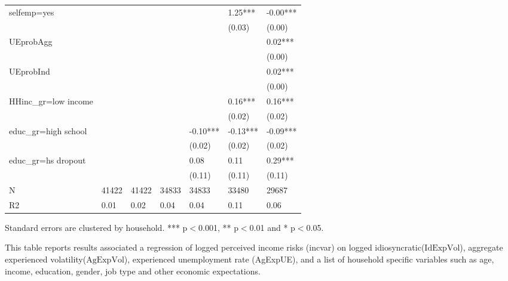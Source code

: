 \begin{table}[p]
\begin{adjustbox}{width=\textwidth}
\begin{threeparttable}
\begin{tabular}{lllllll}
selfemp=yes         &          &           &            &             &      1.25*** &      -0.00*** \\
                    &          &           &            &             &       (0.03) &        (0.00) \\
UEprobAgg           &          &           &            &             &              &       0.02*** \\
                    &          &           &            &             &              &        (0.00) \\
UEprobInd           &          &           &            &             &              &       0.02*** \\
                    &          &           &            &             &              &        (0.00) \\
HHinc\_gr=low income &          &           &            &             &      0.16*** &       0.16*** \\
                    &          &           &            &             &       (0.02) &        (0.02) \\
educ\_gr=high school &          &           &            &    -0.10*** &     -0.13*** &      -0.09*** \\
                    &          &           &            &      (0.02) &       (0.02) &        (0.02) \\
educ\_gr=hs dropout  &          &           &            &        0.08 &         0.11 &       0.29*** \\
                    &          &           &            &      (0.11) &       (0.11) &        (0.11) \\
N                   &    41422 &     41422 &      34833 &       34833 &        33480 &         29687 \\
R2                  &     0.01 &      0.02 &       0.04 &        0.04 &         0.11 &          0.06 \\
\bottomrule
\end{tabular}
	\begin{flushleft}
\item Standard errors are clustered by household. *** p$<$0.001, ** p$<$0.01 and * p$<$0.05. 
\item This table reports results associated a regression of logged perceived income risks (incvar) on logged idiosyncratic($\text{IdExpVol}$), aggregate experienced volatility($\text{AgExpVol}$), experienced unemployment rate (AgExpUE), and a list of household specific variables such as age, income, education, gender, job type and other economic expectations.
\end{flushleft}
\end{threeparttable}
\end{adjustbox}
\end{table}
\clearpage

